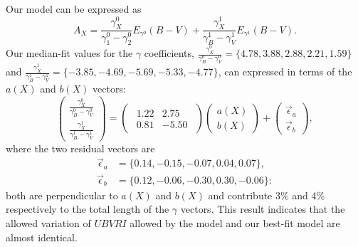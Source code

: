\documentclass{aastex61}   	%
\begin{document}
Our model can be expressed as
\begin{equation}
A_X = \frac{\gamma^0_X}{\gamma^0_1-\gamma^0_2}  E_{\gamma^0}(B-V) +  \frac{\gamma^1_X}{\gamma^1_B-\gamma^1_V}  E_{\gamma^1}(B-V).
\end{equation}
\color{red}
Our median-fit values for the $\gamma$ coefficients,
$\frac{\gamma^0_X}{\gamma^0_B-\gamma^0_V}  =\{4.78,   3.88,   2.88,   2.21,   1.59\}$ and
$ \frac{\gamma^1_X}{\gamma^1_B-\gamma^1_V}=\{-3.85,   -4.69,   -5.69,  -5.33,  -4.77\}$,
\color{black}
can expressed in terms of the $a(X)$ and $b(X)$ vectors:
\begin{equation}
\begin{pmatrix}
 \frac{\gamma^0_X}{\gamma^0_B-\gamma^0_V} \\
\frac{\gamma^1_X}{\gamma^1_B-\gamma^1_V} 
\end{pmatrix}=
\begin{pmatrix}
\begin{array}{rr}
1.22 & 2.75 \\
0.81 & -5.50
\end{array}
\end{pmatrix} 
\begin{pmatrix}
a(X) \\
b(X)
\end{pmatrix}+
\begin{pmatrix}
\vec{\epsilon}_a \\
\vec{\epsilon}_b
\end{pmatrix},
\end{equation}
where the two residual vectors are
\color{red}
\begin{align}
\vec{\epsilon}_a &=\{0.14, -0.15, -0.07,  0.04, 0.07\}, \\
\vec{\epsilon}_b & =\{0.12, -0.06, -0.30, 0.30, -0.06\}:
\end{align}
\color{black}
both are perpendicular to $a(X)$ and $b(X)$ and
contribute  3\% and 4\% respectively to the total  length of the $\gamma$ vectors.
This result indicates that
the allowed variation of $UBVRI$ allowed by the  model and our best-fit model are almost identical.
\end{document}
